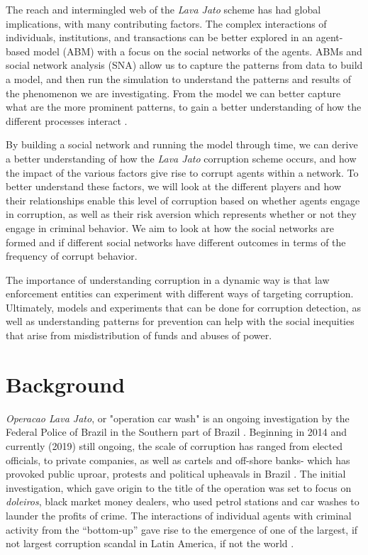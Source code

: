 \documentclass[letterpaper, 11pt]{article}
\begin{document}
The reach and intermingled web of  the \emph{Lava Jato} scheme has had global implications, with many contributing factors. The complex interactions of individuals, institutions, and transactions can be better explored in an agent-based model (ABM) with a focus on the social networks of the agents. ABMs and social network analysis (SNA) allow us to capture the patterns from data to build a model, and then run the simulation to understand the patterns and results of the phenomenon we are investigating. From the model we can better capture what are the more prominent patterns, to gain a better understanding of how the different processes interact \citep{gilbert2005}.

By building a social network and running the model through time, we can derive a better understanding of how the \emph{Lava Jato} corruption scheme occurs, and how the impact of the various factors give rise to corrupt agents within a network. To better understand these factors, we will look at the different players and how their relationships enable this level of corruption based on whether agents engage in corruption, as well as their risk aversion which represents whether or not they engage in criminal behavior. We aim to look at how the social networks are formed and if different social networks have different outcomes in terms of the frequency of corrupt behavior. 

The importance of understanding corruption in a dynamic way is that law enforcement entities can experiment with different ways of targeting corruption. Ultimately, models and experiments that can be done for corruption detection, as well as understanding patterns for prevention can help with the social inequities that arise from misdistribution of funds and abuses of power.

\section{Background}
\label{sec:org78256a0}

\emph{Operacao Lava Jato}, or "operation car wash" is an ongoing investigation by the Federal Police of Brazil in the Southern part of Brazil \citep{federal_2018}. Beginning in 2014 and currently (2019) still ongoing, the scale of corruption has ranged from elected officials, to private companies, as well as cartels and off-shore banks- which has provoked public uproar, protests and political upheavals in Brazil \citep{goldstein2018}. The initial investigation, which gave origin to the title of the operation was set to focus on \emph{doleiros}, black market money dealers, who used petrol stations and car washes to launder the profits of crime. The interactions of individual agents with criminal activity from the “bottom-up” gave rise to the emergence of one of the largest, if not largest corruption scandal in Latin America, if not the world \citep{angelico2017}. 
\end{document}
